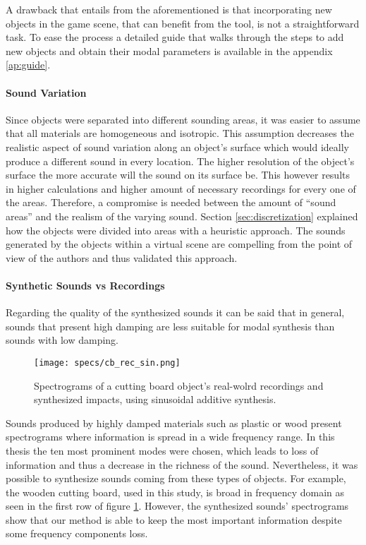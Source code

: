 A drawback that entails from the aforementioned is that incorporating new objects in the game scene, that can benefit from the tool, is not a straightforward task. To ease the process a detailed guide that walks through the steps to add new objects and obtain their modal parameters is available in the appendix \ref{ap:guide}. 

\paragraph{Sound Variation}
\hfill \break

Since objects were separated into different sounding areas, it was easier to assume that all materials are homogeneous and isotropic. This assumption decreases the realistic aspect of sound variation along an object's surface which would ideally produce a different sound in every location. The higher resolution of the object's surface the more accurate will the sound on its surface be. This however results in higher calculations and higher amount of necessary recordings for every one of the areas. Therefore, a compromise is needed between the amount of ``sound areas'' and the realism of the varying sound. Section \ref{sec:discretization} explained how the objects were divided into areas with a heuristic approach. The sounds generated by the objects within a virtual scene are compelling from the point of view of the authors and thus validated this approach.



\paragraph{Synthetic Sounds vs Recordings}\label{par:synthvsrec}
\hfill \break

Regarding the quality of the synthesized sounds it can be said that in general, sounds that present high damping are less suitable for modal synthesis than sounds with low damping. 

\begin{figure}[H]
  \centering
    \texttt{[image: specs/cb\_rec\_sin.png]}
      \caption{Spectrograms of a cutting board object's real-wolrd recordings and synthesized impacts, using sinusoidal additive synthesis.}
      \label{fig:specs_cb}
\end{figure}

Sounds produced by highly damped materials such as plastic or wood present spectrograms where information is spread in a wide frequency range. In this thesis the ten most prominent modes were chosen, which leads to loss of information and thus a decrease in the richness of the sound. Nevertheless, it was possible to synthesize sounds coming from these types of objects. For example, the wooden cutting board, used in this study, is broad in frequency domain as seen in the first row of figure \ref{fig:specs_cb}. However, the synthesized sounds' spectrograms show that our method is able to keep the most important information despite some frequency components loss. 

